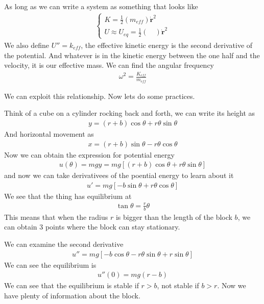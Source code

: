 \documentclass[12pt]{article}
\newcommand{\sqbkt}[1]{\left[ #1 \right]}
\newcommand{\paren}[1]{\left( #1 \right)}
\begin{document}
As long as we can write a system as something that looks like
\begin{align}
\begin{cases}
    K = \frac{1}{2}\paren{m_{eff}}\dot{\mathbf{r}}^2\\
    U \approx U_{eq} = \frac{1}{2}\paren{\quad}\dot{\mathbf{r}}^2
\end{cases}
\end{align}
We also define $U'' = k_{eff}$, the effective kinetic energy is the second derivative of the potential. And whatever is in the kinetic energy between the one half and the velocity, it is our effective mass. We can find the angular frequency
\begin{align}
\omega^2 = \frac{K_{eff}}{m_{eff}}
\end{align}

We can exploit this relationship. Now lets do some practices. 

Think of a cube on a cylinder rocking back and forth, we can write its height as
\begin{align}
y = (r+b)\cos\theta + r\theta\sin\theta
\end{align}
And horizontal movement as
\begin{align}
x = (r+b)\sin\theta-r\theta\cos\theta
\end{align}
Now we can obtain the expression for potential energy
\begin{align}
u(\theta) = mgy = mg\sqbkt{(r+b)\cos\theta + r\theta\sin\theta}
\end{align}
and now we can take derivativees of the poential energy to learn about it
\begin{align}
u' = mg\sqbkt{-b\sin\theta + r\theta\cos\theta}
\end{align}
We see that the thing has equilibrium at
\begin{align}
\tan\theta = \frac{r}{b}\theta
\end{align}
This means that when the radius $r$ is bigger than the length of the block $b$, we can obtain 3 points where the block can stay stationary.

We can examine the second derivative
\begin{align}
u'' = mg\sqbkt{-b\cos\theta - r\theta\sin\theta+r\sin\theta}
\end{align}
We can see the equilibrium is
\begin{align}
u''(0) = mg\paren{r-b}
\end{align}
We can see that the equilibrium is stable if $r>b$, not stable if $b>r$. Now we have plenty of information about the block. 
\end{document}
